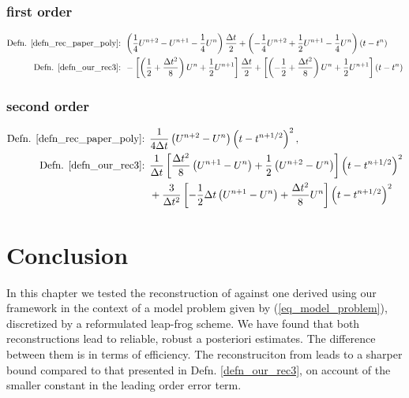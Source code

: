 \documentclass[12pt,a4paper]{article}
\numberwithin{equation}{section}
\theoremstyle{definition}
\newcommand{\qp}[1]{\left(#1\right)}
\newcommand{\qb}[1]{\left[#1\right]}
\begin{document}
\subsubsection{first order}
\begin{equation*}
\begin{aligned}
\text{Defn. \ref{defn_rec_paper_poly}: }& \qp{\frac{1}{4}U^{n+2}-U^{n+1}-\frac{1}{4}U^{n}}\frac{\Delta t}{2}+\qp{-\frac{1}{4}U^{n+2}+\frac{1}{2}U^{n+1}-\frac{1}{4}U^{n}} \qp{t-t^n}\\
\text{Defn. \ref{defn_our_rec3}: }&  -\qb{\qp{\frac{1}{2}+\frac{\Delta t^2}{8}}U^{n}+\frac{1}{2}U^{n+1}}\frac{\Delta t}{2}+
\qb{\qp{-\frac{1}{2}+\frac{\Delta t^2}{8}}U^{n}+\frac{1}{2}U^{n+1}}\qp{t-t^n}
\end{aligned}
\end{equation*}
\subsubsection{second order}
\begin{equation*}
\begin{aligned}
\text{Defn. \ref{defn_rec_paper_poly}: }& \frac{1}{4\Delta t}\qp{U^{n+2}-U^{n}}\qp{t-t^{n+1/2}}^2,\\
\text{Defn. \ref{defn_our_rec3}: }&  \frac{1}{\Delta t}\qb{\frac{\Delta t^2}{8}\qp{U^{n+1}-U^{n}}+\frac{1}{2}\qp{U^{n+2}-U^{n}}}\qp{t-t^{n+1/2}}^2\\
&+\frac{3}{\Delta t^2}\qb{-\frac{1}{2}\Delta t\qp{U^{n+1}-U^{n}}+\frac{\Delta t^2}{8}U^{n}}\qp{t-t^{n+1/2}}^2
\end{aligned}
\end{equation*}

\section{Conclusion}
In this chapter we tested the reconstruction of \cite{georgoulis2016posteriori} against one derived using our framework in the context of a model problem given by (\ref{eq_model_problem}), discretized by a reformulated leap-frog scheme. We have found that both reconstructions lead to reliable, robust a posteriori estimates.  The difference between them is in terms of efficiency.  The reconstruciton from \cite{georgoulis2016posteriori} leads to a sharper bound compared to that presented in Defn. \ref{defn_our_rec3}, on account of the smaller constant in the leading order error term. 




\end{document}
